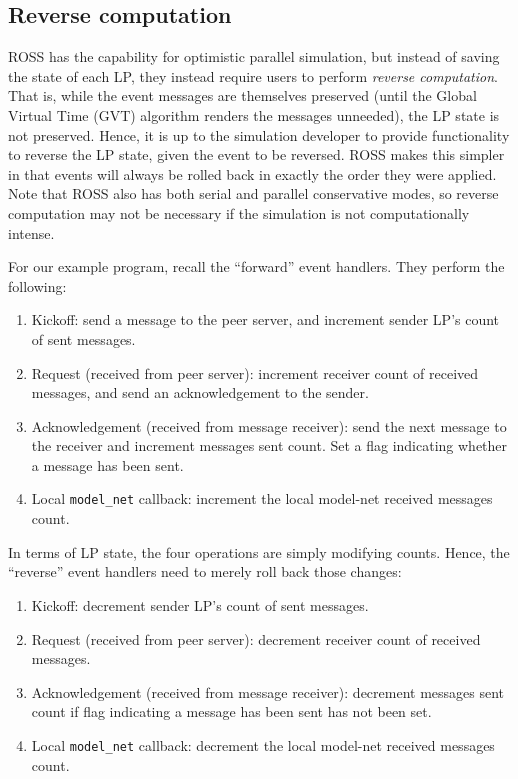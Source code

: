 \documentclass[conference,10pt,compsocconf,onecolumn]{IEEEtran}
\newcommand{\codesmodelnet}[1]{\texttt{model\_net}}
\begin{document}
\subsection{Reverse computation}

ROSS has the capability for optimistic parallel simulation, but instead of
saving the state of each LP, they instead require users to perform \emph{reverse
computation}. That is, while the event messages are themselves preserved (until
the Global Virtual Time (GVT) algorithm renders the messages unneeded), the LP
state is not preserved. Hence, it is up to the simulation developer to provide
functionality to reverse the LP state, given the event to be reversed. ROSS
makes this simpler in that events will always be rolled back in exactly the
order they were applied. Note that ROSS also has both serial and parallel
conservative modes, so reverse computation may not be necessary if the
simulation is not computationally intense.

For our example program, recall the ``forward'' event handlers. They perform the
following: 
\begin{enumerate}
    \item Kickoff: send a message to the peer server, and increment sender LP's
        count of sent messages.
    \item Request (received from peer server): increment receiver count of
        received messages, and send an acknowledgement to the sender.
    \item Acknowledgement (received from message receiver): send the next
        message to the receiver and increment messages sent count. Set a flag
        indicating whether a message has been sent.  
    \item Local \codesmodelnet{} callback: increment the local model-net
        received messages count.
\end{enumerate}

In terms of LP state, the four operations are simply modifying counts. Hence,
the ``reverse'' event handlers need to merely roll back those changes: 
\begin{enumerate}
    \item  Kickoff: decrement sender LP's count of sent messages.
    \item Request (received from peer server): decrement receiver count of
        received messages.
    \item Acknowledgement (received from message receiver): decrement messages
        sent count if flag indicating a message has been sent has not been
        set.
    \item Local \codesmodelnet{} callback: decrement the local model-net
        received messages count.
\end{enumerate}
\end{document}
